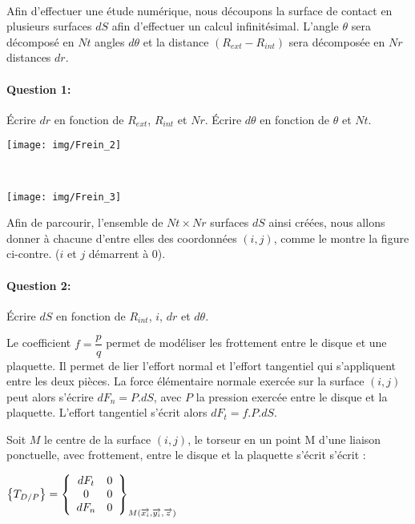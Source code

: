 ~\

\begin{minipage}{0.47\linewidth}
Afin d'effectuer une étude numérique, nous découpons la surface de contact en plusieurs surfaces $dS$ afin d'effectuer un calcul infinitésimal. L'angle $\theta$ sera décomposé en $Nt$ angles $d\theta$ et la distance $(R_{ext}-R_{int})$ sera décomposée en $Nr$ distances $dr$.

\paragraph{Question 1:} Écrire $dr$ en fonction de $R_{ext}$, $R_{int}$ et $Nr$. Écrire $d\theta$ en fonction de $\theta$ et $Nt$.
\end{minipage}\hfill
\begin{minipage}{0.47\linewidth}
 \centering\texttt{[image: img/Frein\_2]}
\end{minipage}

~\

\begin{minipage}{0.47\linewidth}
 \centering\texttt{[image: img/Frein\_3]}
\end{minipage}\hfill
\begin{minipage}{0.47\linewidth}
Afin de parcourir, l'ensemble de $Nt\times Nr$ surfaces $dS$ ainsi créées, nous allons donner à chacune d'entre elles des coordonnées $(i,j)$, comme le montre la figure ci-contre. ($i$ et $j$ démarrent à $0$).

\paragraph{Question 2:} Écrire $dS$ en fonction de $R_{int}$, $i$, $dr$ et $d\theta$.
\end{minipage}

Le coefficient $f=\dfrac{p}{q}$ permet de modéliser les frottement entre le disque et une plaquette. Il permet de lier l'effort normal et l'effort tangentiel qui s'appliquent entre les deux pièces. La force élémentaire normale exercée sur la surface $(i,j)$ peut alors s'écrire $dF_n=P.dS$, avec $P$ la pression exercée entre le disque et la plaquette. L'effort tangentiel s'écrit alors $dF_t=f.P.dS$.

Soit $M$ le centre de la surface $(i,j)$, le torseur en un point M d'une liaison ponctuelle, avec frottement, entre le disque et la plaquette s'écrit s'écrit :

$\left\{T_{D/P}\right\}=\left\{\begin{array}{c c}
dF_t & 0 \\ 0 & 0 \\ dF_n & 0
\end{array}\right\}_{M(\overrightarrow{x_i},\overrightarrow{y_i},\overrightarrow{z})}$

